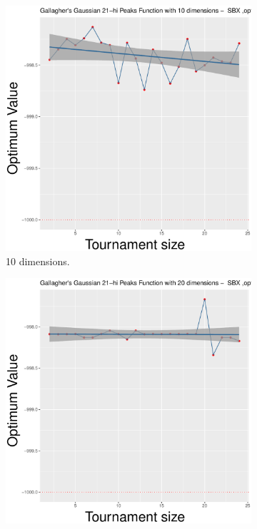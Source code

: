 \begin{figure}[t]
	\begin{subfigure}[b]{0.33\textwidth}
		\centering
		\includegraphics[width=\textwidth]{img/2n2n-10D/multimodal_2n2n_22_dim_10.pdf}
		\caption{10 dimensions.}
	\end{subfigure}
	\begin{subfigure}[b]{0.33\textwidth}
		\centering
		\includegraphics[width=\textwidth]{img/2n2n-20D/multimodal_2n2n_22_dim_20.pdf}

\end{subfigure}
\end{figure}
